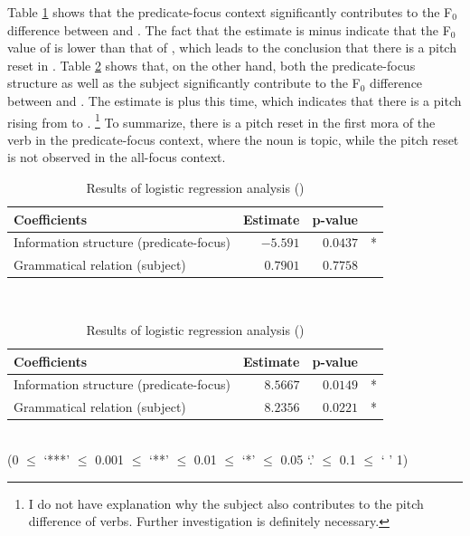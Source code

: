 Table \ref{Pitchv1n3GlmT} shows that
the predicate-focus context significantly contributes to
the F$_{0}$ difference between  and .
The fact that the estimate is minus indicate that the F$_{0}$ value of  is lower than that of ,
which leads to the conclusion that there is a pitch reset in .
Table \ref{Pitchv2v1GlmT} shows that, on the other hand,
both the predicate-focus structure as well as the subject significantly contribute to the F$_{0}$ difference between  and .
The estimate is plus this time,
which indicates that there is a pitch rising from  to .%
	\footnote{I do not have explanation why the subject also contributes to the pitch difference of verbs.
	Further investigation is definitely necessary.}
To summarize,
there is a pitch reset in the first mora of the verb in the predicate-focus context, where the noun is topic,
while the pitch reset is not observed in the all-focus context.


\begin{table}
\centering
\caption{Results of logistic regression analysis ()}
\begin{tabular}{lrrr}
\toprule
Coefficients  & Estimate & p-value & \\
\midrule
 Information structure (predicate-focus)          & $-5.591$   & $0.0437$  & *  \\
 Grammatical relation (subject)          & $0.7901$   & $0.7758$  &   \\
\bottomrule
\end{tabular} \\
\label{Pitchv1n3GlmT}
\end{table}

\begin{table}
\centering
\caption{Results of logistic regression analysis ()}
\begin{tabular}{lrrr}
\toprule
Coefficients  & Estimate & p-value & \\
\midrule
 Information structure (predicate-focus)    & $8.5667$   & $0.0149$  & *  \\
 Grammatical relation (subject)     & $8.2356$   & $0.0221$  & *  \\
\bottomrule
\end{tabular} \\
\hfill{(0 $\le$ `***' $\le$ 0.001 $\le$ `**' $\le$ 0.01 $\le$ `*' $\le$ 0.05 `.' $\le$ 0.1 $\le$ ` ' 1)}
\label{Pitchv2v1GlmT}
\end{table}

